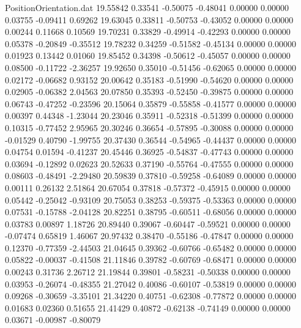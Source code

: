\begin{filecontents}{PositionOrientation.dat}
  19.55842    0.33541   -0.50075    -0.48041    0.00000    0.00000    0.03755   -0.09411    0.69262
  19.63045    0.33811   -0.50753    -0.43052    0.00000    0.00000    0.00244    0.11668    0.10569
  19.70231    0.33829   -0.49914    -0.42293    0.00000    0.00000    0.05378   -0.20849   -0.35512
  19.78232    0.34259   -0.51582    -0.45134    0.00000    0.00000    0.01923    0.13442    0.01060
  19.85452    0.34398   -0.50612    -0.45057    0.00000    0.00000    0.08500   -0.11722   -2.36257
  19.92650    0.35010   -0.51456    -0.62065    0.00000    0.00000    0.02172   -0.06682    0.93152
  20.00642    0.35183   -0.51990    -0.54620    0.00000    0.00000    0.02905   -0.06382    2.04563
  20.07850    0.35393   -0.52450    -0.39875    0.00000    0.00000    0.06743   -0.47252   -0.23596
  20.15064    0.35879   -0.55858    -0.41577    0.00000    0.00000    0.00397    0.44348   -1.23044
  20.23046    0.35911   -0.52318    -0.51399    0.00000    0.00000    0.10315   -0.77452    2.95965
  20.30246    0.36654   -0.57895    -0.30088    0.00000    0.00000   -0.01529    0.40790   -1.99755
  20.37430    0.36544   -0.54965    -0.44437    0.00000    0.00000    0.04754    0.01594   -0.41237
  20.45446    0.36925   -0.54837    -0.47743    0.00000    0.00000    0.03694   -0.12892    0.02623
  20.52633    0.37190   -0.55764    -0.47555    0.00000    0.00000    0.08603   -0.48491   -2.29480
  20.59839    0.37810   -0.59258    -0.64089    0.00000    0.00000    0.00111    0.26132    2.51864
  20.67054    0.37818   -0.57372    -0.45915    0.00000    0.00000    0.05442   -0.25042   -0.93109
  20.75053    0.38253   -0.59375    -0.53363    0.00000    0.00000    0.07531   -0.15788   -2.04128
  20.82251    0.38795   -0.60511    -0.68056    0.00000    0.00000    0.03783    0.00897    1.18726
  20.89440    0.39067   -0.60447    -0.59521    0.00000    0.00000   -0.07474    0.65819    1.46067
  20.97432    0.38470   -0.55186    -0.47847    0.00000    0.00000    0.12370   -0.77359   -2.44503
  21.04645    0.39362   -0.60766    -0.65482    0.00000    0.00000    0.05822   -0.00037   -0.41508
  21.11846    0.39782   -0.60769    -0.68471    0.00000    0.00000    0.00243    0.31736    2.26712
  21.19844    0.39801   -0.58231    -0.50338    0.00000    0.00000    0.03953   -0.26074   -0.48355
  21.27042    0.40086   -0.60107    -0.53819    0.00000    0.00000    0.09268   -0.30659   -3.35101
  21.34220    0.40751   -0.62308    -0.77872    0.00000    0.00000    0.01683    0.02360    0.51655
  21.41429    0.40872   -0.62138    -0.74149    0.00000    0.00000    0.03671   -0.00987   -0.80079

\end{filecontents}
